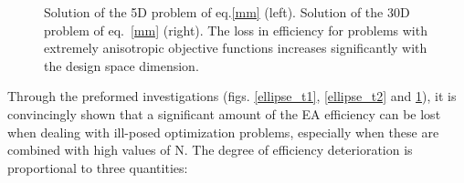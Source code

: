 \begin{figure}[h!]
\begin{minipage}[b]{0.5\linewidth}
 \centering
\end{minipage}
\begin{minipage}[b]{0.5\linewidth}
 \centering
\end{minipage}
\caption{Solution of the 5D problem of eq.\ref{mm} (left). Solution of the 30D problem of eq.\ \ref{mm} (right). The loss in efficiency for problems with extremely anisotropic objective functions increases significantly with the design space dimension.} 
\label{multimodres}
\end{figure}

Through the preformed investigations  (figs. \ref{ellipse_t1}, \ref{ellipse_t2} and \ref{multimodres}), it is convincingly shown  that a significant amount of the EA efficiency can be lost when dealing with ill-posed optimization problems, especially when these are combined with high values of N. The degree of efficiency deterioration is proportional to three quantities:


